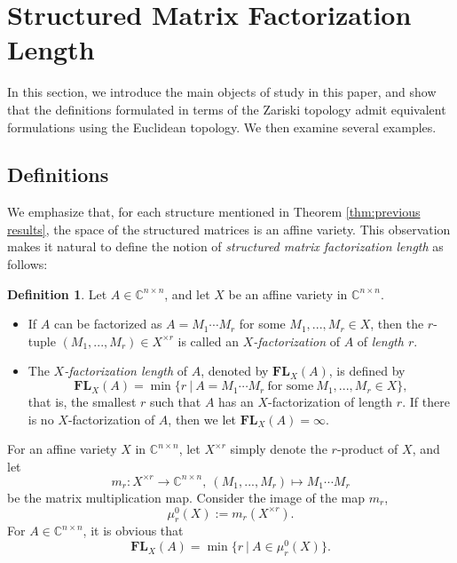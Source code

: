 \documentclass[reqno]{amsart}
\theoremstyle{definition}
\newtheorem{definition}[theorem]{Definition}
\newcommand{\C}{\mathbb{C}}
\numberwithin{equation}{section}
\begin{document}
\section{Structured Matrix Factorization Length}\label{section:Structured Matrix Factorization Length}

In this section, we introduce the main objects of study in this paper, and show that the definitions formulated in terms of the Zariski topology admit equivalent formulations using the Euclidean topology. We then examine several examples.

\subsection{Definitions}

We emphasize that, for each structure mentioned in Theorem \ref{thm:previous results}, the space of the structured matrices is an affine variety. This observation makes it natural to define the notion of \emph{structured matrix factorization length} as follows:

\begin{definition}\label{def:structured factorization length}
    Let $A \in \C^{n \times n}$, and let $X$ be an affine variety in $\mathbb{C}^{n \times n}$. 
    \begin{itemize}
        \item [(\romannumeral1)] If $A$ can be factorized as $A=M_1 \cdots M_r$ for some $M_1,...,M_r \in X$, then the $r$-tuple $(M_1,...,M_r) \in X^{\times r}$ is called an  \emph{$X$-factorization} of $A$ of \emph{length $r$}.
        \item [(\romannumeral2)] The \emph{$X$-factorization length} of $A$, denoted by $\mathbf{FL}_X(A)$, is defined by
        \begin{equation*}
            \mathbf{FL}_{X}(A)=\min\{r~|~A=M_1 \cdots M_r~\text{for some}~ M_1,...,M_r \in X\},
        \end{equation*}
        that is, the smallest $r$ such that $A$ has an $X$-factorization of length $r$. If there is no $X$-factorization of $A$, then we let $\mathbf{FL}_X(A)=\infty$.
    \end{itemize}
\end{definition}

For an affine variety $X$ in $\mathbb{C}^{n \times n}$, let $X^{\times r}$ simply denote the $r$-product of $X$, and let
    \begin{equation*}
         m_r: X^{\times r} \rightarrow \C^{n \times n},~(M_1,...,M_r) \mapsto M_1 \cdots M_r
    \end{equation*}
be the matrix multiplication map. Consider the image of the map $m_r$,
\begin{equation}\label{eq:alternative definition of structured matrix factorization length}
    \mu_r^0(X):=m_r(X^{\times r}).
\end{equation}
For $A \in \mathbb{C}^{n \times n}$, it is obvious that
\begin{equation*}
    \mathbf{FL}_X(A)=\min\{r~|~A \in \mu_r^0(X)\}.
\end{equation*}
\end{document}
